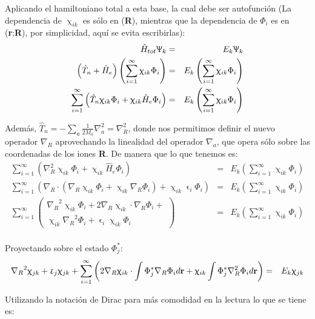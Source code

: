 \documentclass [11pt]{article}
\begin{document}
Aplicando el hamiltoniano total a esta base, la cual debe ser autofunción (La dependencia de $\upchi_{ik}$ es sólo en ({\bf R}), mientras que la dependencia de $\Phi_i$ es en ({\bf r};{\bf R}), por simplicidad, aquí se evita escribirlas):
\begin{eqnarray}
    \hat H_{tot}\Uppsi_k & = & E_k\Uppsi_k\\
    \left({\hat T}_n+{\hat H}_e\right)\left(\sum_{i=1}^{\infty}\upchi_{ik}\Phi_i\right) & = & E_k \left(\sum_{i=1}^{\infty}\upchi_{ik}\Phi_i\right)\\
    \sum_{i=1}^{\infty}\left({\hat T}_n\upchi_{ik}\Phi_i+\upchi_{ik}{\hat H}_e\Phi_i\right) & = & E_k \left(\sum_{i=1}^{\infty}\upchi_{ik}\Phi_i\right)
\end{eqnarray}

Además, $\hat T_n=-\sum_{a}\frac{1}{2M_{a}}\nabla_a^2=\nabla_R^2$, donde nos permitimos definir el nuevo operador $\nabla_R$ aprovechando la linealidad del operador $\nabla_a$, que opera sólo sobre las coordenadas de los iones {\bf R}. De manera que lo que tenemos es:
\begin{eqnarray}
    \sum_{i=1}^{\infty}\left({\nabla_R^2}\upchi_{ik}\Phi_i+\upchi_{ik}{\hat H}_e\Phi_i\right) & = & E_k \left(\sum_{i=1}^{\infty}\upchi_{ik}\Phi_i\right)\\
    \sum_{i=1}^{\infty}\left({\nabla_R}\cdot({\nabla_R}\upchi_{ik}\Phi_i+\upchi_{ik}{\nabla_R}\Phi_i)+\upchi_{ik}\upvarepsilon_i\Phi_i\right) & = & E_k \left(\sum_{i=1}^{\infty}\upchi_{ik}\Phi_i\right)\\
    \sum_{i=1}^{\infty}\left(\begin{array}{cc}
         {\nabla_R}^2\upchi_{ik}\Phi_i+2{\nabla_R}\upchi_{ik}\cdot {\nabla_R}\Phi_i+\\
         \upchi_{ik}{\nabla_R}^2\Phi_i+\upvarepsilon_i\upchi_{ik}\Phi_i
    \end{array}\right) & = & E_k \left(\sum_{i=1}^{\infty}\upchi_{ik}\Phi_i\right)
\end{eqnarray}\\

Proyectando sobre el estado $\Phi_j^*$:
\begin{eqnarray*}
    {\nabla_R}^2\upchi_{jk}+\upvarepsilon_j \upchi_{jk}+\sum_{i=1}^{\infty}\left(2{\nabla_R}\upchi_{ik}\cdot\int \Phi_j^*{\nabla_R}\Phi_i d{\bf r}+\upchi_{ik}\int \Phi_j^*{\nabla_R^2}\Phi_i d{\bf r}\right) & = & E_k\upchi_{jk}
\end{eqnarray*}

Utilizando la notación de Dirac para más comodidad en la lectura lo que se tiene es:
\end{document}
